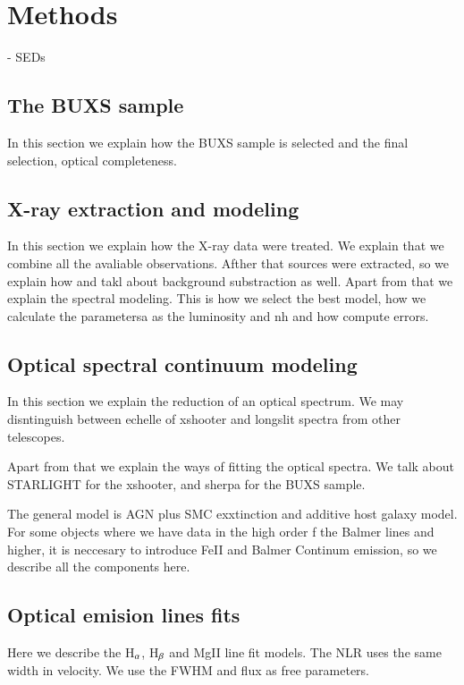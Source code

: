 
\chapter{Methods} %
\label{chap:methods}

           

             - SEDs
\section{The BUXS sample}
\label{sec3:buxs}
In this section we explain how the BUXS sample is selected and the final selection, optical completeness.

\section{X-ray extraction and modeling}
\label{sec3:xray}

In this section we explain how the X-ray data were treated. We explain that we combine all the avaliable observations. Afther that sources were extracted, so we explain how and takl about background substraction as well. Apart from that we explain the spectral modeling. This is how we select the best model, how we calculate the parametersa as the luminosity and nh and how compute errors.

\section{Optical spectral continuum modeling}
\label{sec3:op}

In this section we explain the reduction of an optical spectrum. We may disntinguish between echelle of xshooter and longslit spectra from other telescopes.

Apart from that we explain the ways of fitting the optical spectra. We talk about STARLIGHT for the xshooter, and sherpa for the BUXS sample. 

The general model is AGN plus SMC exxtinction and additive host galaxy model. For some objects where we have data in the high order f the Balmer lines and higher, it is neccesary to introduce FeII and Balmer Continum emission, so we describe all the components here.


\section{Optical emision lines fits}
\label{sec3:lines}

Here we describe the H$_{\rm \alpha}$, H$_{\rm \beta}$ and MgII line fit models. The NLR uses the same width in velocity. We use the FWHM and flux as free parameters.